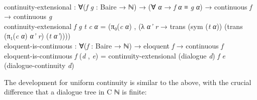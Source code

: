 \documentclass{entcs} \usepackage{prentcsmacro}
\newcommand{\AgdaFontStyle}[1]{\textsf{#1}}
\newcommand{\AgdaBoundFontStyle}[1]{\textit{#1}}
\newcommand{\AgdaSymbol}      [1]{\textcolor{AgdaSymbol}{#1}}
\newcommand{\AgdaBound}    [1]{\AgdaBoundFontStyle{\textcolor{AgdaBound}{#1}}}
\newcommand{\AgdaInductiveConstructor}[1]
    {\AgdaFontStyle{\textcolor{AgdaInductiveConstructor}{#1}}}
\newcommand{\AgdaDatatype} [1]{\AgdaFontStyle{\textcolor{AgdaDatatype}{#1}}}
\newcommand{\AgdaFunction} [1]{\AgdaFontStyle{\textcolor{AgdaFunction}{#1}}}
\newcommand{\AgdaCodeStyle}{\small}
\newenvironment{code}%
{\noindent\AgdaCodeStyle\pboxed}%
{\endpboxed\par\noindent%
\ignorespacesafterend}
\begin{document}
\begin{code}\>\<%
\\
\>\AgdaFunction{continuity-extensional} \AgdaSymbol{:} \AgdaSymbol{∀(}\AgdaBound{f} \AgdaBound{g} \AgdaSymbol{:} \AgdaFunction{Baire} \AgdaSymbol{→} \AgdaDatatype{ℕ}\AgdaSymbol{)} \AgdaSymbol{→} \AgdaSymbol{(∀} \AgdaBound{α} \AgdaSymbol{→} \AgdaBound{f} \AgdaBound{α} \AgdaDatatype{≡} \AgdaBound{g} \AgdaBound{α}\AgdaSymbol{)} \AgdaSymbol{→} \AgdaFunction{continuous} \AgdaBound{f} \AgdaSymbol{→} \AgdaFunction{continuous} \AgdaBound{g}\<%
\\
\>\AgdaFunction{continuity-extensional} \AgdaBound{f} \AgdaBound{g} \AgdaBound{t} \AgdaBound{c} \AgdaBound{α} \AgdaSymbol{=} \AgdaSymbol{(}\AgdaFunction{π₀}\AgdaSymbol{(}\AgdaBound{c} \AgdaBound{α}\AgdaSymbol{)} \AgdaInductiveConstructor{,} \AgdaSymbol{(λ} \AgdaBound{α'} \AgdaBound{r} \AgdaSymbol{→} \AgdaFunction{trans} \AgdaSymbol{(}\AgdaFunction{sym} \AgdaSymbol{(}\AgdaBound{t} \AgdaBound{α}\AgdaSymbol{))} \AgdaSymbol{(}\AgdaFunction{trans} \AgdaSymbol{(}\AgdaFunction{π₁}\AgdaSymbol{(}\AgdaBound{c} \AgdaBound{α}\AgdaSymbol{)} \AgdaBound{α'} \AgdaBound{r}\AgdaSymbol{)} \AgdaSymbol{(}\AgdaBound{t} \AgdaBound{α'}\AgdaSymbol{))))}\<%
\\
\>\AgdaFunction{eloquent-is-continuous} \AgdaSymbol{:} \AgdaSymbol{∀(}\AgdaBound{f} \AgdaSymbol{:} \AgdaFunction{Baire} \AgdaSymbol{→} \AgdaDatatype{ℕ}\AgdaSymbol{)} \AgdaSymbol{→} \AgdaFunction{eloquent} \AgdaBound{f} \AgdaSymbol{→} \AgdaFunction{continuous} \AgdaBound{f}\<%
\\
\>\AgdaFunction{eloquent-is-continuous} \AgdaBound{f} \AgdaSymbol{(}\AgdaBound{d} \AgdaInductiveConstructor{,} \AgdaBound{e}\AgdaSymbol{)} \AgdaSymbol{=} \AgdaFunction{continuity-extensional} \AgdaSymbol{(}\AgdaFunction{dialogue} \AgdaBound{d}\AgdaSymbol{)} \AgdaBound{f} \AgdaBound{e} \AgdaSymbol{(}\AgdaFunction{dialogue-continuity} \AgdaBound{d}\AgdaSymbol{)}\<%
\\
\>\<\end{code}

The development for uniform continuity is similar to the above, with
the crucial difference that a dialogue tree in C ℕ is finite:
\end{document}
